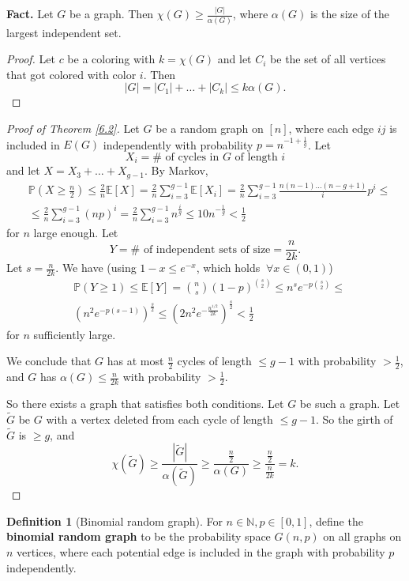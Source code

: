 \documentclass{article}
\theoremstyle{definition}
\newtheorem{defn}{Definition}[section]
\begin{document}
\textbf{Fact.} Let $G$ be a graph. Then $\chi(G)\ge \frac{|G|}{\alpha(G)}$, where $\alpha(G)$ is the size of the largest independent set.
\begin{proof}
    Let $c$ be a coloring with $k=\chi(G)$ and let $C_i$ be the set of all vertices that got colored with color $i$. Then \[
    |G|=|C_1|+\ldots+|C_k| \le k \alpha(G).
    \]
\end{proof} 
\begin{proof}[Proof of Theorem \ref{6.2}]
    Let $G$ be a random graph on $[n]$, where each edge $ij$ is included in $E(G)$ independently with probability $p=n^{-1+\frac{1}{g}}$. Let \[
    X_i = \# \text{ of cycles in }G \text{ of length }i
    \]
    and let $X=X_3+\ldots+X_{g-1}$. By Markov, 
    \begin{align*}
        &\mathbb{P}(X \ge \frac{n}{2}) \le \frac{2}{n} \mathbb{E}[X] = \frac{2}{n} \sum_{i=3}^{g-1} \mathbb{E}[X_i] =\frac{2}{n} \sum_{i=3}^{g-1} \frac{n(n-1)\ldots(n-g+1)}{i}p^{i} \le \\
        &\le \frac{2}{n}\sum_{i=3}^{g-1} (np)^i = \frac{2}{n} \sum_{i=3}^{g-1} n^{\frac{i}{g}} \le 10 n^{-\frac{1}{g}} < \frac{1}{2} 
    \end{align*}
    for $n$ large enough.  Let \[
    Y = \# \text{ of independent sets of size}=\frac{n}{2k}.
    \]
    Let $s=\frac{n}{2k}$. We have (using $1-x \le e^{-x}$, which holds $~\forall x \in (0,1)$)
    \begin{align*}
        &\mathbb{P}(Y\ge 1) \le \mathbb{E}[Y] = {{n}\choose{s}}(1-p)^{{s\choose{2}}}\le n^s e^{-p {{s}\choose{2}}} \le \\
        & (n^2 e^{-p(s-1)})^{\frac{s}{2}} \le (2n^2 e^{-\frac{n^{1/2}}{2k}})^{\frac{s}{2}} < \frac{1}{2}
    \end{align*}
    for $n$ sufficiently large.
    \vspace{1mm}
    
    We conclude that $G$ has at most $\frac{n}{2}$ cycles of length $\le g-1$ with probability $>\frac{1}{2}$, and $G$ has $\alpha(G)\le \frac{n}{2k}$ with probability $>\frac{1}{2}$. 
    \vspace{1mm}
    
    So there exists a graph that satisfies both conditions. Let $G$ be such a graph. Let $\tilde{G}$ be $G$ with a vertex deleted from each cycle of length $\le g-1$. So the girth of $\tilde{G}$ is $\ge g$, and \[
    \chi(\tilde{G}) \ge \frac{|\tilde{G}|}{\alpha(\tilde{G})} \ge \frac{\frac{n}{2}}{\alpha(G)} \ge \frac{\frac{n}{2}}{\frac{n}{2k}} = k.
    \]
\end{proof}
\begin{defn}[Binomial random graph]
    For $n \in \mathbb{N}, p \in [0,1]$, define the \textbf{binomial random graph} to be the probability space $G(n,p)$ on all graphs on $n$ vertices, where each potential edge is included in the graph with probability $p$ independently.
\end{defn}
\end{document}
